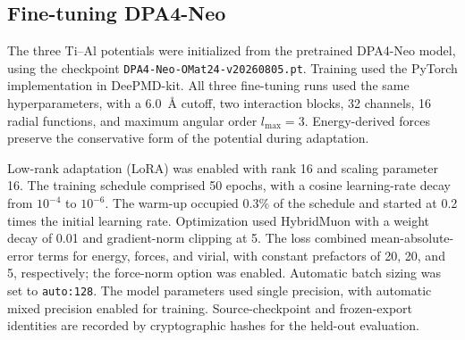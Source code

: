\subsection{Fine-tuning DPA4-Neo}
\label{sec:finetuning}

The three Ti--Al potentials were initialized from the pretrained DPA4-Neo model,\cite{Li2026DPA4} using the checkpoint \texttt{DPA4-Neo-OMat24-v20260805.pt}.
Training used the PyTorch implementation in DeePMD-kit.
All three fine-tuning runs used the same hyperparameters, with a 6.0~\AA{} cutoff, two interaction blocks, 32 channels, 16 radial functions, and maximum angular order $l_{\max}=3$.
Energy-derived forces preserve the conservative form of the potential during adaptation.

Low-rank adaptation (LoRA)\cite{Hu2021} was enabled with rank 16 and scaling parameter 16.
The training schedule comprised 50 epochs, with a cosine learning-rate decay from $10^{-4}$ to $10^{-6}$.
The warm-up occupied 0.3\% of the schedule and started at 0.2 times the initial learning rate.
Optimization used HybridMuon with a weight decay of 0.01 and gradient-norm clipping at 5.
The loss combined mean-absolute-error terms for energy, forces, and virial, with constant prefactors of 20, 20, and 5, respectively; the force-norm option was enabled.
Automatic batch sizing was set to \texttt{auto:128}.
The model parameters used single precision, with automatic mixed precision enabled for training.
Source-checkpoint and frozen-export identities are recorded by cryptographic hashes for the held-out evaluation.

